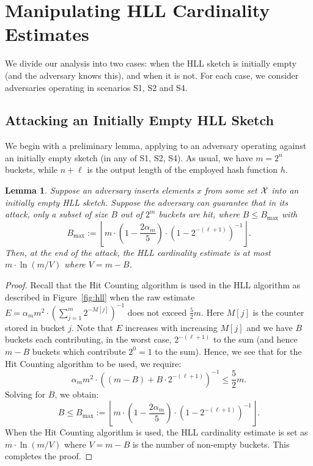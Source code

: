 \documentclass{article}
\newtheorem{lemma}{Lemma}
\begin{document}


\section{Manipulating HLL Cardinality Estimates}\label{sec:manip}

We divide our analysis into two cases: when the HLL sketch is initially empty (and the adversary knows this), and when it is not. For each case, we consider adversaries operating in scenarios S1, S2 and S4.


\subsection{Attacking an Initially Empty HLL Sketch}\label{sec:empty} 

We begin with a preliminary lemma, applying to an adversary operating against an initially empty sketch (in any of S1, S2, S4). As usual, we have $m=2^n$ buckets, while $n+\ell$ is the output length of the employed hash function $h$.

\begin{lemma}\label{lem:bound}
Suppose an adversary inserts elements $x$ from some set ${\cal X}$ into an initially empty HLL sketch. Suppose the adversary can guarantee that in its attack, only a subset of size $B$ out of $2^m$ buckets are hit, where $B \leq B_{\max}$ with 
\[
B_{\max} := \left\lfloor m\cdot\left(1-\frac{2\alpha_m}{5}\right)\cdot\left(1-2^{-(\ell+1)}\right)^{-1} \right\rfloor. \label{eqn:1} 
\]
Then, at the end of the attack, the HLL cardinality estimate is at most $m \cdot \ln (m/V)$ where $V = m-B$.
\end{lemma}

\begin{proof}
Recall that the Hit Counting algorithm is used in the HLL algorithm as described in Figure~\ref{fig:hll} when the raw 
estimate $E = \alpha_mm^2\cdot(\sum_{j=1}^m2^{-M[j]})^{-1}$ does not exceed $\frac{5}{2}m$. Here $M[j]$ is the counter stored in bucket $j$. Note that $E$ increases with increasing $M[j]$ and we have $B$ buckets each contributing, in the worst case, $2^{-(\ell+1)}$ to the sum (and hence $m-B$ buckets which contribute $2^{0}=1$ to the sum). Hence, we see that for the Hit Counting algorithm to be used, we require:
\[
\alpha_mm^2\cdot\left((m-B)+B\cdot2^{-(\ell+1)}\right)^{-1} \le \frac{5}{2}m.
\]
Solving for $B$, we obtain:
\[
B \le B_{\max} := \left\lfloor m\cdot\left(1-\frac{2\alpha_m}{5}\right)\cdot\left(1-2^{-(\ell+1)}\right)^{-1} \right\rfloor.
\]
When the Hit Counting algorithm is used, the HLL cardinality estimate is set as $m \cdot \ln (m/V)$ where $V = m-B$ is the number of non-empty buckets. This completes the proof.
\end{proof}
\end{document}
